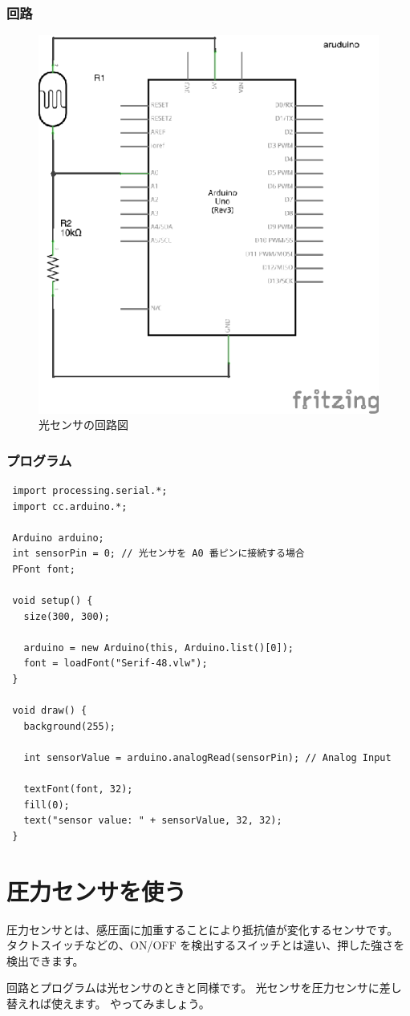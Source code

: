 \documentclass[11pt,a4paper]{jarticle}
\begin{document}
\subsubsection*{回路}
\begin{figure}[h!]
 \centering
 \includegraphics[width=0.4\columnwidth]{img/light_sensor_circuit.eps}
 \caption{光センサの回路図}
\end{figure}


\subsubsection*{プログラム}
\begin{lstlisting}
 import processing.serial.*;
 import cc.arduino.*;
 
 Arduino arduino;
 int sensorPin = 0; // 光センサを A0 番ピンに接続する場合
 PFont font;
 
 void setup() {
   size(300, 300);

   arduino = new Arduino(this, Arduino.list()[0]);
   font = loadFont("Serif-48.vlw");
 }

 void draw() {
   background(255);

   int sensorValue = arduino.analogRead(sensorPin); // Analog Input

   textFont(font, 32);
   fill(0);
   text("sensor value: " + sensorValue, 32, 32);
 }
\end{lstlisting}

\newpage

\section{圧力センサを使う}
圧力センサとは、感圧面に加重することにより抵抗値が変化するセンサです。
タクトスイッチなどの、ON/OFF を検出するスイッチとは違い、押した強さを検出できます。

回路とプログラムは光センサのときと同様です。
光センサを圧力センサに差し替えれば使えます。
やってみましょう。
\end{document}
